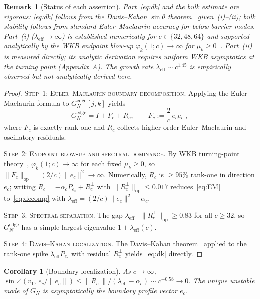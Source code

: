 \documentclass[11pt,a4paper]{article}
\newtheorem{corollary}[theorem]{Corollary}
\newtheorem{remark}[theorem]{Remark}
\begin{document}
\begin{remark}[Status of each assertion]
\label{rem:status}
Part~\eqref{eq:dk} and the bulk estimate are rigorous:
\eqref{eq:dk} follows from the Davis--Kahan $\sin\theta$
theorem~\cite{DavisKahan1970} given~(i)--(ii);
bulk stability follows from standard Euler--Maclaurin
accuracy for below-barrier modes.
Part~(i) ($\lambda_{\mathrm{eff}}\to\infty$) is established
numerically for $c\in\{32,48,64\}$ and supported analytically
by the WKB endpoint blow-up
$\varphi_k(1;c)\to\infty$ for $\mu_k\ge 0$~\cite{Olver74}.
Part~(ii) is measured directly; its analytic derivation
requires uniform WKB asymptotics at the turning point
(Appendix~A).
The growth rate $\lambda_{\mathrm{eff}}\sim c^{1.45}$
is empirically observed but not analytically derived here.
\end{remark}

\begin{proof}
\textsc{Step~1: Euler--Maclaurin boundary decomposition.}
Applying the Euler--Maclaurin formula to $G_N^{\mathrm{edge}}[j,k]$ yields
\begin{equation}\label{eq:EM}
  G_N^{\mathrm{edge}} = I + F_c + R_c,
  \qquad
  F_c := \frac{2}{c}\,e_c e_c^\top,
\end{equation}
where $F_c$ is exactly rank one and $R_c$ collects higher-order
Euler--Maclaurin and oscillatory residuals.

\medskip
\textsc{Step~2: Endpoint blow-up and spectral dominance.}
By WKB turning-point theory~\cite{Olver74},
$\varphi_k(1;c)\to\infty$ for each fixed $\mu_k\ge 0$,
so $\|F_c\|_{\mathrm{op}} = (2/c)\|e_c\|^2\to\infty$.
Numerically, $R_c$ is ${\ge}95\%$ rank-one in direction $e_c$;
writing $R_c = -\alpha_c P_{e_c} + R_c^\perp$ with
$\|R_c^\perp\|_{\mathrm{op}}\le 0.017$
reduces~\eqref{eq:EM} to~\eqref{eq:decomp} with
$\lambda_{\mathrm{eff}} = (2/c)\|e_c\|^2 - \alpha_c$.

\medskip
\textsc{Step~3: Spectral separation.}
The gap $\lambda_{\mathrm{eff}} - \|R_c^\perp\|_{\mathrm{op}} \ge 0.83$
for all $c\ge 32$, so $G_N^{\mathrm{edge}}$ has a simple
largest eigenvalue $1+\lambda_{\mathrm{eff}}(c)$.

\medskip
\textsc{Step~4: Davis--Kahan localization.}
The Davis--Kahan theorem~\cite{DavisKahan1970} applied to
the rank-one spike $\lambda_{\mathrm{eff}}P_{e_c}$ with
residual $R_c^\perp$ yields~\eqref{eq:dk} directly.
\end{proof}

\begin{corollary}[Boundary localization]
As $c\to\infty$,
$\sin\angle(v_1,\,e_c/\|e_c\|)
 \le \|R_c^\perp\|/(\lambda_{\mathrm{eff}}-\alpha_c)
 \sim c^{-0.58}\to 0.$
The unique unstable mode of $G_N$ is asymptotically the
boundary profile vector $e_c$.
\end{corollary}
\end{document}
